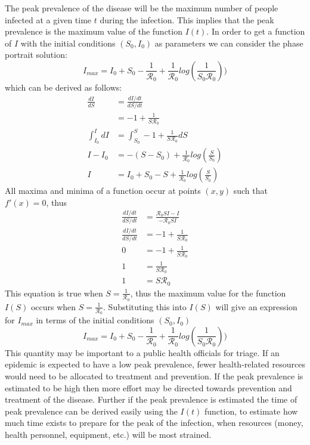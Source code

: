 The peak prevalence of the disease will be the maximum number of people infected at a given time $t$ during the infection.
This implies that the peak prevalence is the maximum value of the function $I(t)$.
In order to get a function of $I$ with the initial conditions $(S_0,I_0)$ as parameters we can consider the phase portrait solution:
$$ I_{max} = I_0 + S_0 - \frac{1}{\mathcal R_0} + \frac{1}{\mathcal R_0}log(\frac{1}{S_0\mathcal R_0}))$$
which can be derived as follows:
\begin{align*}
    \frac{dI}{dS}     &= \frac{dI/dt}{dS/dt}\\
                      &= -1 + \frac{1}{S\mathcal R_0}\\
    \int_{I_0}^{I} dI &= \int_{S_0}^{S} -1 + \frac{1}{S\mathcal R_0}dS\\
    I - I_0           &= -(S - S_0) + \frac{1}{\mathcal R_0}log(\frac{S}{S_0})\\
    I                 &= I_0 + S_0 - S + \frac{1}{\mathcal R_0}log(\frac{S}{S_0})
\end{align*}
All maxima and minima of a function occur at points $(x,y)$ such that $f'(x) = 0$, thus
\begin{align*}
    \frac{dI/dt}{dS/dt} &= \frac{{\mathcal R_0}SI - I}{-\mathcal R_0SI}\\
    \frac{dI/dt}{dS/dt} &= -1 + \frac{1}{S\mathcal R_0}\\
    0                   &= -1 + \frac{1}{S\mathcal R_0}\\
    1                   &= \frac{1}{S\mathcal R_0}\\
    1                   &= S{\mathcal R_0}
\end{align*}
This equation is true when $S = \frac{1}{\mathcal R_0}$, thus the maximum value for the function $I(S)$ occurs when $S = \frac{1}{\mathcal R_0}$.
Substituting this into $I(S)$ will give an expression for $I_{max}$ in terms of the initial conditions $(S_0,I_0)$
$$ I_{max} = I_0 + S_0 - \frac{1}{\mathcal R_0} + \frac{1}{\mathcal R_0}log(\frac{1}{S_0\mathcal R_0}))$$
This quantity may be important to a public health officials for triage. If an epidemic is expected to have a low peak prevalence, fewer health-related resources would need to be allocated to treatment and prevention.
If the peak prevalence is estimated to be high then more effort may be directed towards prevention and treatment of the disease.
Further if the peak prevalence is estimated the time of peak prevalence can be derived easily using the $I(t)$ function, to estimate how much time exists to prepare for the peak of the infection, when resources (money, health personnel, equipment, etc.) will be most strained.
